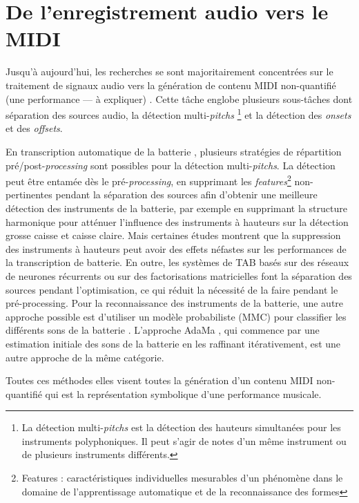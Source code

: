 \section{De l’enregistrement audio vers le MIDI}
\label{audio_to_midi}
Jusqu’à aujourd’hui, les recherches se sont majoritairement concentrées sur le
traitement de signaux audio vers la génération de contenu MIDI non-quantifié
(une performance — à expliquer) \cite{AMT_for_2_Instru}. Cette tâche englobe
plusieurs sous-tâches dont séparation des sources audio, la détection
multi-\textit{pitchs} \footnote{La détection multi-\textit{pitchs} est la
détection des hauteurs simultanées pour les instruments polyphoniques. Il peut
s’agir de notes d’un même instrument ou de plusieurs instruments différents.}
et la détection des \textit{onsets} et des \textit{offsets}.


En transcription automatique de la batterie \cite{Review_ADT}, plusieurs
stratégies de répartition pré/post-\textit{processing} sont possibles pour la
détection multi-\textit{pitchs}. La détection peut être entamée dès le
pré-\textit{processing}, en supprimant les \textit{features}\footnote{
Features : caractéristiques individuelles mesurables d'un phénomène dans le
domaine de l'apprentissage automatique et de la reconnaissance des formes}
non-pertinentes pendant la séparation des sources afin d’obtenir une meilleure
détection des instruments de la batterie, par exemple en supprimant la
structure harmonique pour atténuer l’influence des instruments à hauteurs sur
la détection grosse caisse et caisse claire. Mais certaines études montrent que
la suppression des instruments à hauteurs peut avoir des effets néfastes sur
les performances de la transcription de batterie. En outre, les systèmes de TAB
basés sur des réseaux de neurones récurrents ou sur des factorisations
matricielles font la séparation des sources pendant l’optimisation, ce qui
réduit la nécessité de la faire pendant le pré-processing. Pour la
reconnaissance des instruments de la batterie, une autre approche possible est
d’utiliser un modèle probabiliste (MMC) pour classifier les différents sons de
la batterie \cite{Eronen}. L’approche AdaMa \cite{adama_1}, qui commence par
une estimation initiale des sons de la batterie en les raffinant itérativement,
est une autre approche de la même catégorie.

Toutes ces méthodes elles visent toutes la génération d’un contenu MIDI
non-quantifié qui est la représentation symbolique d’une performance musicale.

